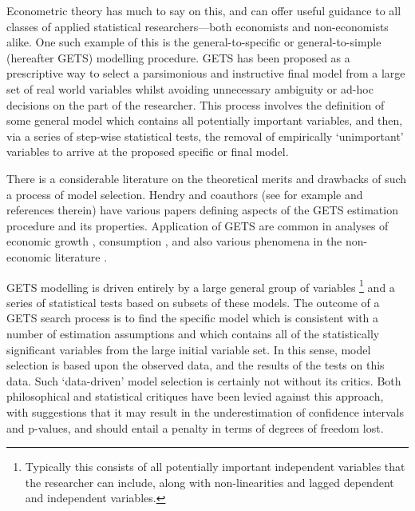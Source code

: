 \documentclass[bib]{statapress}
\begin{document}
Econometric theory has much to say on this, and can offer useful guidance to 
all classes of applied statistical researchers---both economists and 
non-economists alike.  One such example of this is the general-to-specific or 
general-to-simple (hereafter GETS) modelling procedure.  GETS has been proposed
as a prescriptive way to select a parsimonious and instructive final model from 
a large set of real world variables whilst avoiding unnecessary ambiguity or 
ad-hoc decisions on the part of the researcher.  This process involves the 
definition of some general model which contains all potentially important 
variables, and then, via a series of step-wise statistical tests, the removal 
of empirically `unimportant' variables to arrive at the proposed specific or 
final model.

There is a considerable literature on the theoretical merits and drawbacks of
such a process of model selection.  Hendry and coauthors (see for example
\citet{KrolzigHendry2001,Camposetal2005,HendryKrolzig2005} and references 
therein) have various papers defining aspects of the GETS estimation procedure 
and its properties.  Application of GETS are common in analyses of economic 
growth \citep{HendryKrolzig2004}, consumption 
\citep{HooverPerez1999,CamposEricsson1999}, and also various phenomena in the 
non-economic literature \citep{SucarratEscribiano,Cairnsetal2011}.

GETS modelling is driven entirely by a large general group of variables%
\footnote{Typically this consists of all potentially important independent 
variables that the researcher can include, along with non-linearities and 
lagged dependent and independent variables.} and a series of statistical tests
based on subsets of these models.  The outcome of a GETS search process is to
find the specific model which is consistent with a number of estimation 
assumptions and which contains all of the statistically significant variables
from the large initial variable set. In this sense, model selection is based
upon the observed data, and the results of the tests on this data. Such 
`data-driven' model selection is certainly not without its critics. Both
philosophical \citep{Kennedy2002b,Kennedy2002} and statistical 
\citep{Harrell2001} critiques have been levied against this approach, with 
suggestions that it may result in the underestimation of confidence intervals 
and p-values, and should entail a penalty in terms of degrees of freedom lost.
\end{document}

